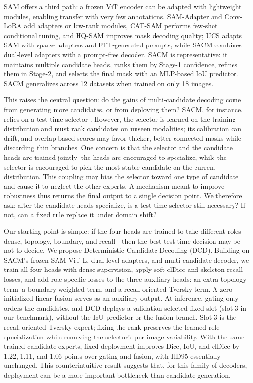 SAM \cite{kirillov2023sam} offers a third path: a frozen ViT encoder can be
adapted with lightweight modules, enabling transfer with very few annotations.
SAM-Adapter \cite{chen2023samadapter} and Conv-LoRA \cite{zhong2024convlora}
add adapters or low-rank modules, CAT-SAM \cite{xiao2024catsam} performs
few-shot conditional tuning, and HQ-SAM \cite{ke2023hqsam} improves mask
decoding quality; UCS \cite{zhu2025ucs} adapts SAM with sparse adapters and
FFT-generated prompts, while SACM \cite{zhu2026sacm} combines dual-level
adapters with a prompt-free decoder. SACM is representative: it maintains
multiple candidate heads, ranks them by Stage-1 confidence, refines them in
Stage-2, and selects the final mask with an MLP-based IoU predictor. SACM generalizes across
12 datasets when trained on only 18 images.

This raises the central question: do the gains of multi-candidate decoding come
from generating more candidates, or from deploying them? SACM, for instance,
relies on a test-time selector \cite{zhu2026sacm}. However, the selector is
learned on the training distribution and must rank candidates on unseen
modalities; its calibration can drift, and overlap-based scores may favor
thicker, better-connected masks while discarding thin branches. One concern is
that the selector and the candidate heads are trained jointly: the heads are
encouraged to specialize, while the selector is encouraged to pick the most
stable candidate on the current distribution. This coupling may bias the
selector toward one type of candidate and cause it to neglect the other
experts. A
mechanism meant to improve robustness thus returns the final output to a
single decision point. We therefore ask: after the candidate heads
specialize, is a test-time selector still necessary? If not, can a fixed rule
replace it under domain shift?

Our starting point is simple: if the four heads are trained to take different
roles---dense, topology, boundary, and recall---then the best test-time
decision may be not to decide. We propose Deterministic Candidate Decoding
(DCD). Building on SACM's frozen SAM ViT-L, dual-level adapters, and
multi-candidate decoder, we train all four heads with dense supervision, apply
soft clDice and skeleton recall losses, and add role-specific losses to the
three auxiliary heads: an extra topology term, a boundary-weighted term, and a
recall-oriented Tversky term. A zero-initialized linear fusion serves as an
auxiliary output. At inference, gating only orders the candidates, and DCD
deploys a validation-selected fixed slot (slot 3 in our benchmark), without the
IoU predictor or the fusion branch. Slot 3 is the recall-oriented Tversky
expert; fixing the rank preserves the learned role specialization while
removing the selector's per-image variability. With the same trained candidate experts, fixed deployment improves
Dice, IoU, and clDice by 1.22, 1.11, and 1.06 points over gating and fusion,
with HD95 essentially unchanged. This counterintuitive result suggests that, for
this family of decoders, deployment can be a more important bottleneck than
candidate generation.

